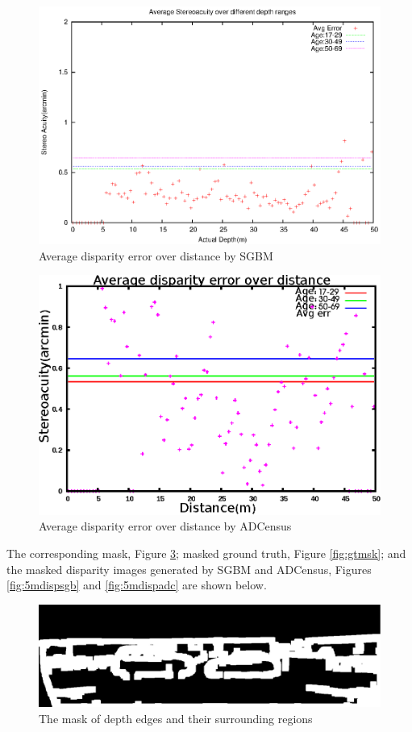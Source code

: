 \begin{figure}[H]
\centering
\includegraphics[scale=0.8]{sgbmimg5pix3msk}
\caption{Average disparity error over distance by SGBM}
\label{fig:imgmsk5}
\end{figure} 

\begin{figure}[H]
\centering
\includegraphics[scale=0.8]{adcimg5pix3msk}
\caption{Average disparity error over distance by ADCensus}
\label{fig:imgfull5}
\end{figure}

\noindent
The corresponding mask, Figure \ref{fig:msk}; masked ground truth, Figure \ref{fig:gtmsk}; and
the masked disparity images generated by SGBM and ADCensus, Figures \ref{fig:5mdispsgb} and \ref{fig:5mdispadc} 
are shown below.

\begin{figure}[H]
\centering
\includegraphics[scale=0.35]{5msk}
\caption{The mask of depth edges and their surrounding regions}
\label{fig:msk}
\end{figure} 

